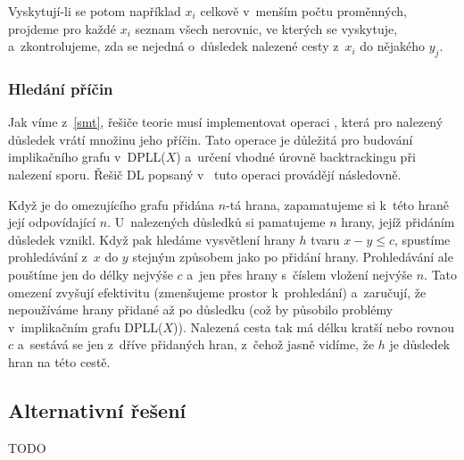 Vyskytují-li se potom například $x_i$ celkově v~menším počtu proměnných, projdeme pro každé $x_i$ seznam všech nerovnic, ve kterých se vyskytuje, a~zkontrolujeme, zda se nejedná o~důsledek nalezené cesty z~$x_i$ do nějakého $y_j$.

\subsubsection*{Hledání příčin}

Jak víme z~\ref{smt}, řešiče teorie musí implementovat operaci , která pro nalezený důsledek vrátí množinu jeho příčin. Tato operace je důležitá pro budování implikačního grafu v~DPLL($X$) a~určení vhodné úrovně backtrackingu při nalezení sporu. Řešič DL popsaný v~\cite{Nieuwenhuis05} tuto operaci provádějí následovně.

Když je do omezujícího grafu přidána $n$-tá hrana, zapamatujeme si k~této hraně její odpovídající $n$. U~nalezených důsledků si pamatujeme $n$ hrany, jejíž přidáním důsledek vznikl. Když pak hledáme vysvětlení hrany $h$ tvaru $x-y \leq c$, spustíme prohledávání z~$x$ do $y$ stejným způsobem jako po přidání hrany. Prohledávání ale pouštíme jen do délky nejvýše $c$ a~jen přes hrany s~číslem vložení nejvýše $n$. Tato omezení zvyšují efektivitu (zmenšujeme prostor k~prohledání) a~zaručují, že nepoužíváme hrany přidané až po důsledku (což by působilo problémy v~implikačním grafu DPLL($X$)). Nalezená cesta tak má délku kratší nebo rovnou $c$ a~sestává se jen z~dříve přidaných hran, z~čehož jasně vidíme, že $h$ je důsledek hran na této cestě.

\subsection{Alternativní řešení}

TODO

